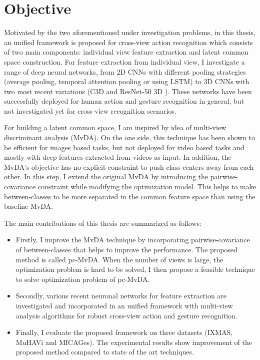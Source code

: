     \section{Objective} \label{sec:intro_objective}
        Motivated by the two aforementioned under investigation problems, in this thesis, an unified framework is proposed for cross-view action recognition which consists of two main components: individual view feature extraction and latent common space construction.
        For feature extraction from individual view, I investigate a range of deep neural networks, from 2D CNNs with different pooling strategies (average pooling, temporal attention pooling or using LSTM) to 3D CNNs with two most recent variations (C3D \cite{tran2015learning} and ResNet-50 3D \cite{hara2018can}).
        These networks have been successfully deployed for human action and gesture recognition in general, but not investigated yet for cross-view recognition scenarios.

        For building a latent common space, I am inspired by idea of multi-view discriminant analysis (MvDA).
        On the one side, this technique has been shown to be efficient for images based tasks, but not deployed for video based tasks and mostly with deep features extracted from videos as input.
        In addition, the MvDA's objective has no explicit constraint to push class centers away from each other.
        In this step, I extend the original MvDA by introducing the pairwise-covariance constraint while modifying the optimization model.
        This helps to make between-classes to be more separated in the common feature space than using the baseline MvDA.

        The main contributions of this thesis are summarized as follows: 
        \begin{itemize}
            \item Firstly, I improve the MvDA technique by incorporating pairwise-covariance of between-classes that helps to improve the performance. The proposed method is called pc-MvDA. When the number of views is large, the optimization problem is hard to be solved, I then propose a feasible technique to solve optimization problem of pc-MvDA.
            \item Secondly, various recent neuronal networks for feature extraction are investigated and incorporated in an unified framework with multi-view analysis algorithms for robust cross-view action and gesture recognition.
            \item Finally, I evaluate the proposed framework on three datasets (IXMAS, MuHAVi and MICAGes). The experimental results show improvement of the proposed method compared to state of the art techniques.
        \end{itemize}

